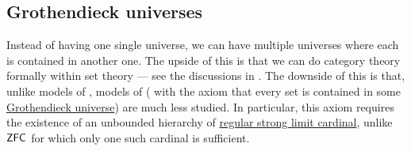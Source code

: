 \subsection{Grothendieck universes}\label{subsec:grothendieck_universes}

Instead of having one single universe, we can have multiple universes where each is contained in another one. The upside of this is that we can do category theory formally within set theory --- see the discussions in . The downside of this is that, unlike models of \hyperref[def:zfc]{}, models of \hyperref[def:axiom_of_universes]{} ( with the axiom that every set is contained in some \hyperref[def:grothendieck_universe]{Grothendieck universe}) are much less studied. In particular, this axiom requires the existence of an unbounded hierarchy of \hyperref[rem:strongly_inaccessible_cardinal]{regular strong limit cardinal}, unlike \( \textsf{ZFC} \) for which only one such cardinal is sufficient.

